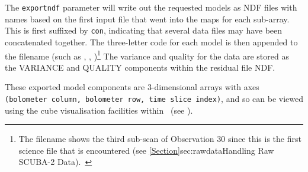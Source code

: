 The \texttt{exportndf} parameter will write out the requested models
as NDF files with names based on the first input file that went into
the maps for each sub-array. This is first suffixed by \texttt{con},
indicating that several data files may have been concatenated
together. The three-letter code for each model is then appended to the
filename (such as ,
,
)\footnote{The filename
shows the third sub-scan of Observation 30 since this is the first science
file that is encountered (see \cref{Section}{sec:rawdata}{Handling Raw
SCUBA-2 Data}).~} The variance and quality for the data are stored as
the VARIANCE and QUALITY components within the residual file NDF.

\begin{tip}
  These exported model components are 3-dimensional arrays with axes \texttt{
  (bolometer column, bolometer row, time slice index)}, and so can be viewed
  using the cube visualisation facilities within \gaia\ (see \gaiasun).
\end{tip}



